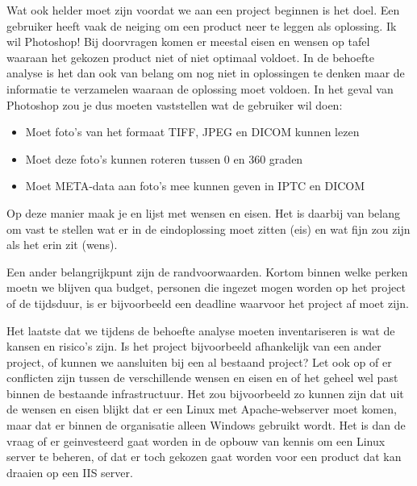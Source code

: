 Wat ook helder moet zijn voordat we aan een project beginnen is het doel. Een gebruiker heeft vaak de neiging om een product neer te leggen als oplossing. Ik wil Photoshop! Bij doorvragen komen er meestal eisen en wensen op tafel waaraan het gekozen product niet of niet optimaal voldoet. In de behoefte analyse is het dan ook van belang om nog niet in oplossingen te denken maar de informatie te verzamelen waaraan de oplossing moet voldoen. In het geval van Photoshop zou je dus moeten vaststellen wat de gebruiker wil doen:
\begin{itemize}
\item Moet foto's van het formaat TIFF, JPEG en DICOM kunnen lezen
\item Moet deze foto's kunnen roteren tussen 0 en 360 graden
\item Moet META-data aan foto's mee kunnen geven in IPTC en DICOM
\end{itemize}
Op deze manier maak je en lijst met wensen en eisen. Het is daarbij van belang om vast te stellen wat er in de eindoplossing moet zitten (eis) en wat fijn zou zijn als het erin zit (wens).

Een ander belangrijkpunt zijn de randvoorwaarden. Kortom binnen welke perken moetn we blijven qua budget, personen die ingezet mogen worden op het project of de tijdsduur, is er bijvoorbeeld een deadline waarvoor het project af moet zijn.

Het laatste dat we tijdens de behoefte analyse moeten inventariseren is wat de kansen en risico's zijn. Is het project bijvoorbeeld afhankelijk van een ander project, of kunnen we aansluiten bij een al bestaand project? Let ook op of er conflicten zijn tussen de verschillende wensen en eisen en of het geheel wel past binnen de bestaande infrastructuur. Het zou bijvoorbeeld zo kunnen zijn dat uit de wensen en eisen blijkt dat er een Linux met Apache-webserver moet komen, maar dat er binnen de organisatie alleen Windows gebruikt wordt. Het is dan de vraag of er geinvesteerd gaat worden in de opbouw van kennis om een Linux server te beheren, of dat er toch gekozen gaat worden voor een product dat kan draaien op een IIS server.
